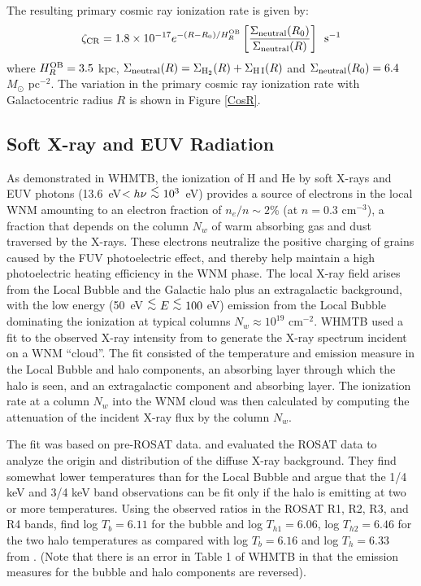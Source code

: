 \documentclass[12pt,preprint,flushrt]{aastex}
\newcommand{\al}{\mbox{ \raisebox{-.4ex}{$\stackrel{\textstyle <}{\sim}$} }}
\begin{document}
The resulting primary cosmic ray ionization rate is given by:
\begin{equation}
    \zeta_{\rm CR}=1.8\times 10^{-17}
   {e}^{-(R-R_0)/H_{R}^{\rm OB}} \left [ \frac{\Sigma_{\rm neutral}(R_0)}
   {\Sigma_{\rm neutral}(R)} \right ]\,\,\, {\rm s^{-1}}
\end{equation}
where $H_{R}^{\rm OB}=3.5$ kpc,
$\Sigma_{\rm neutral}(R) =\Sigma_{\rm H_2}(R) +\Sigma_{\rm H\,I}(R)$ and
$\Sigma_{\rm neutral}(R_0) = 6.4$ $M_\odot$ pc$^{-2}$. The variation
in the primary cosmic ray ionization rate with Galactocentric radius $R$ is
shown in Figure \ref{CosR}.

\subsection{Soft X-ray and EUV Radiation}

As demonstrated in WHMTB, the ionization of H and He by soft X-rays
and EUV photons (13.6~eV$<h\nu\al 10^3$~eV) provides
a source of electrons in the local WNM amounting to an electron
fraction of $n_e/n\sim 2$\% (at $n = 0.3$ cm$^{-3}$), a fraction 
that depends on the column $N_w$
of warm absorbing gas and dust traversed by the X-rays.
These electrons neutralize the positive charging of grains caused by the
FUV photoelectric effect, and thereby help maintain a high
photoelectric heating efficiency in the WNM phase. The local X-ray field
arises from the Local Bubble and the Galactic halo plus an
extragalactic background, with the low energy (50~eV$\al E\al 100$ eV)
emission from the Local Bubble dominating the ionization at typical
columns $N_w\approx 10^{19}$ cm$^{-2}$. WHMTB used a fit to the
observed X-ray
intensity from \cite{gar92} to generate the X-ray spectrum
incident on a WNM ``cloud''. The fit consisted of the temperature and emission
measure in the Local Bubble and halo components, an absorbing layer through
which the halo is seen, and an extragalactic component and absorbing layer.
The ionization rate at a column $N_w$ into the WNM cloud was then calculated
by computing the attenuation of the incident X-ray flux by the column $N_w$.

The \cite{gar92} fit was based on pre-ROSAT data.
\cite{sno98} and \cite{kuntz00} evaluated the ROSAT data to analyze
the origin and distribution of the diffuse X-ray background.
They find somewhat lower temperatures than \cite{gar92} for the
Local Bubble and argue that the 1/4 keV and 3/4 keV
band observations can be fit only if the halo is emitting at two or more
temperatures. Using the observed ratios in the ROSAT R1, R2, R3, and
R4 bands,  \cite{kuntz00} find
log $T_{b} = 6.11$ for the bubble and log $T_{h1} = 6.06$, log $T_{h2}=6.46$
for the two halo temperatures as compared
with log $T_b = 6.16$ and log $T_h = 6.33$ from \cite{gar92}.
(Note that there is an error in Table 1 of WHMTB in that the emission
measures for the bubble and halo components are reversed).
\end{document}
